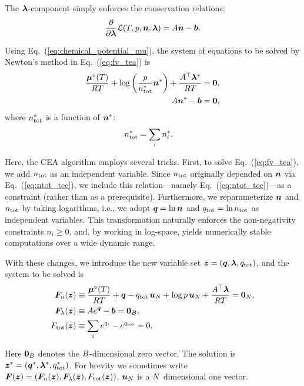 The $\boldsymbol{\lambda}$-component simply enforces the conservation relations:
\begin{align}
\label{eq:Lpartiall}
\frac{\partial}{\partial \boldsymbol{\lambda}}  \mathcal{L}(T, p, \boldsymbol{n}, \boldsymbol{\lambda}) = A \boldsymbol{n} - \boldsymbol{b}.
\end{align}

Using Eq.~(\ref{eq:chemical_potential_mu}), the system of equations to be solved by Newton’s method in Eq.~(\ref{eq:fv_tea}) is
\begin{align}
\label{eq:Lpartialnx}
    \frac{\boldsymbol{\mu}^\circ(T)}{RT}+ \log{\left(\frac{p}{n_\mathrm{tot}^\ast} \boldsymbol{n}^\ast \right)} + \frac{A^\top \boldsymbol{\lambda}^\ast}{RT}   &= \boldsymbol{0}, \\
    A \boldsymbol{n}^\ast - \boldsymbol{b} &= \boldsymbol{0},
\end{align}
where $n_\mathrm{tot}^\ast$ is a function of $\boldsymbol{n}^\ast$:
\begin{align}
n_\mathrm{tot}^\ast &= \sum_i n_i^\ast.
\end{align}



Here, the CEA algorithm employs several tricks. First, to solve Eq.~(\ref{eq:fv_tea}), we add $n_\mathrm{tot}$ as an independent variable. Since $n_\mathrm{tot}$ originally depended on $\boldsymbol{n}$ via Eq.~(\ref{eq:ntot_tce}), we include this relation—namely Eq.~(\ref{eq:ntot_tce})—as a constraint (rather than as a prerequisite). Furthermore, we reparameterize $\boldsymbol{n}$ and $n_\mathrm{tot}$ by taking logarithms, i.e., we adopt $\boldsymbol{q} = \ln{\boldsymbol{n}}$ and $q_\mathrm{tot} = \ln{n_\mathrm{tot}}$ as independent variables. This transformation naturally enforces the non-negativity constraints $n_i \ge 0$, and, by working in log-space, yields numerically stable computations over a wide dynamic range. 

With these changes, we introduce the new variable set $\boldsymbol{z} = (\boldsymbol{q}, \boldsymbol{\lambda}, q_\mathrm{tot})$, and the system to be solved is
\begin{align}
\label{eq:Lpartialncea}
    \boldsymbol{F}_n (\boldsymbol{z}) &\equiv \frac{\boldsymbol{\mu}^\circ(T)}{RT} + \boldsymbol{q} - q_\mathrm{tot} \, \boldsymbol{u}_N + \log{p} \, \boldsymbol{u}_N  + \frac{A^\top \boldsymbol{\lambda}}{RT}= \boldsymbol{0}_N,  \\
    \boldsymbol{F}_\lambda (\boldsymbol{z}) &\equiv A e^{\boldsymbol{q}} - \boldsymbol{b} = \boldsymbol{0}_B, \\
    F_\mathrm{tot} (\boldsymbol{z}) &\equiv \sum_i {e^{q_i}} - e^{q_\mathrm{tot}} = 0.
\end{align}

Here $\boldsymbol{0}_B$ denotes the $B$-dimensional zero vector. The solution is $\boldsymbol{z}^\ast = (\boldsymbol{q}^\ast, \boldsymbol{\lambda}^\ast, q_\mathrm{tot}^\ast)$. For brevity we sometimes write $\boldsymbol{F} (\boldsymbol{z}) = (\boldsymbol{F}_n (\boldsymbol{z}), \boldsymbol{F}_\lambda (\boldsymbol{z}), F_\mathrm{tot} (\boldsymbol{z}))$. $\boldsymbol{u}_N$ is a $N$ dimensional one vector.

